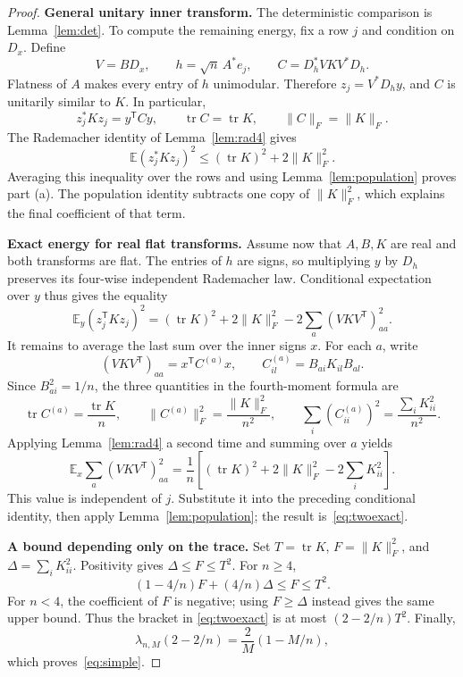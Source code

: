 \documentclass[11pt,a4paper]{article}
\theoremstyle{definition}
\theoremstyle{remark}
\numberwithin{equation}{section}
\newcommand{\E}{\mathbb E}
\newcommand{\tr}{\operatorname{tr}}
\newcommand{\norm}[1]{\lVert#1\rVert}
\begin{document}
\begin{proof}

\noindent\textbf{General unitary inner transform.}\enspace
The deterministic comparison is Lemma~\ref{lem:det}. To compute the
remaining energy, fix a row $j$ and condition on $D_x$. Define
\[
 V=BD_x,\qquad h=\sqrt n\,A^*e_j,\qquad
 C=D_h^*VKV^*D_h.
\]
Flatness of $A$ makes every entry of $h$ unimodular. Therefore
$z_j=V^*D_hy$, and $C$ is unitarily similar to $K$. In particular,
\[
 z_j^*Kz_j=y^{\mathsf T}Cy,
 \qquad \tr C=\tr K,\qquad \norm C_F=\norm K_F.
\]
The Rademacher identity of Lemma~\ref{lem:rad4} gives
\[
 \E(z_j^*Kz_j)^2\le(\tr K)^2+2\norm K_F^2.
\]
Averaging this inequality over the rows and using
Lemma~\ref{lem:population} proves part (a). The population identity
subtracts one copy of $\norm K_F^2$, which explains the final coefficient
of that term.

\noindent\textbf{Exact energy for real flat transforms.}\enspace
Assume now that $A,B,K$ are real and both transforms are flat.
The entries of $h$ are signs, so multiplying $y$ by $D_h$ preserves
its four-wise independent Rademacher law. Conditional expectation over $y$
thus gives the equality
\[
 \E_y(z_j^{\mathsf T}Kz_j)^2
 =(\tr K)^2+2\norm K_F^2
     -2\sum_a(VKV^{\mathsf T})_{aa}^2.
\]
It remains to average the last sum over the inner signs $x$.
For each $a$, write
\[
 (VKV^{\mathsf T})_{aa}=x^{\mathsf T}C^{(a)}x,
 \qquad C^{(a)}_{il}=B_{ai}K_{il}B_{al}.
\]
Since $B_{ai}^2=1/n$, the three quantities in the fourth-moment formula are
\[
 \tr C^{(a)}=\frac{\tr K}{n},\qquad
 \norm{C^{(a)}}_F^2=\frac{\norm K_F^2}{n^2},\qquad
 \sum_i(C^{(a)}_{ii})^2=\frac{\sum_iK_{ii}^2}{n^2}.
\]
Applying Lemma~\ref{lem:rad4} a second time and summing over $a$ yields
\[
 \E_x\sum_a(VKV^{\mathsf T})_{aa}^2
 =\frac1n\left[(\tr K)^2+2\norm K_F^2-2\sum_iK_{ii}^2\right].
\]
This value is independent of $j$. Substitute it into the preceding
conditional identity, then apply Lemma~\ref{lem:population}; the result
is~\eqref{eq:twoexact}.

\noindent\textbf{A bound depending only on the trace.}\enspace
Set $T=\tr K$, $F=\norm K_F^2$, and $\Delta=\sum_iK_{ii}^2$.
Positivity gives $\Delta\le F\le T^2$. For $n\ge4$,
\[
 (1-4/n)F+(4/n)\Delta\le F\le T^2.
\]
For $n<4$, the coefficient of $F$ is negative; using $F\ge\Delta$
instead gives the same upper bound. Thus the bracket in
\eqref{eq:twoexact} is at most $(2-2/n)T^2$. Finally,
\[
 \lambda_{n,M}(2-2/n)=\frac2M(1-M/n),
\]
which proves~\eqref{eq:simple}.

\end{proof}
\end{document}
